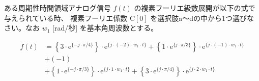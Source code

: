 ある周期性時間領域アナログ信号 $f(t)$ の複素フーリエ級数展開が以下の式で与えられている時、
複素フーリエ係数 $\textrm{C}[0]$ を選択肢a〜dの中から1つ選びなさい。なお $w_1$ [rad/秒] を基本角周波数とする。

\begin{align*}
f(t) 
&= \left \{ 3 \cdot \textrm{e}^{\{-j \cdot \pi/4 \}} \right \} \cdot \textrm{e}^{\{ j \cdot (-2) \cdot w_1 \cdot t \}} 
 + \left \{ 1 \cdot \textrm{e}^{\{ j \cdot \pi/3 \}} \right \} \cdot \textrm{e}^{\{ j \cdot (-1) \cdot w_1 \cdot t \}} \\
&+ (-1) \\
&+ \left \{ 1 \cdot \textrm{e}^{\{-j \cdot \pi/3 \}} \right \} \cdot \textrm{e}^{\{ j \cdot    1 \cdot w_1 \cdot t \}} 
 + \left \{ 3 \cdot \textrm{e}^{\{ j \cdot \pi/4 \}} \right \} \cdot \textrm{e}^{\{ j \cdot    2 \cdot w_1 \cdot t \}} 
\end{align*}
